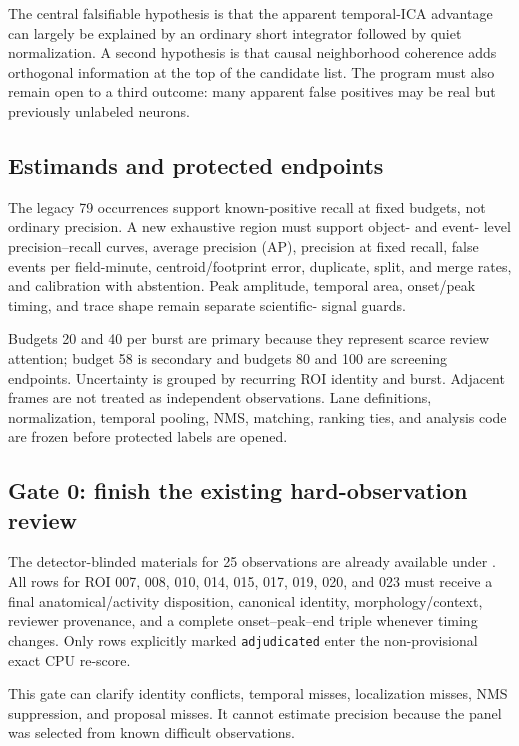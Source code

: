 The central falsifiable hypothesis is that the apparent temporal-ICA advantage
can largely be explained by an ordinary short integrator followed by quiet
normalization. A second hypothesis is that causal neighborhood coherence adds
orthogonal information at the top of the candidate list. The program must also
remain open to a third outcome: many apparent false positives may be real but
previously unlabeled neurons.

\subsection{Estimands and protected endpoints}

The legacy 79 occurrences support known-positive recall at fixed budgets, not
ordinary precision. A new exhaustive region must support object- and event-
level precision--recall curves, average precision (AP), precision at fixed
recall, false events per field-minute, centroid/footprint error, duplicate,
split, and merge rates, and calibration with abstention. Peak amplitude,
temporal area, onset/peak timing, and trace shape remain separate scientific-
signal guards.

Budgets 20 and 40 per burst are primary because they represent scarce review
attention; budget 58 is secondary and budgets 80 and 100 are screening
endpoints. Uncertainty is grouped by recurring ROI identity and burst. Adjacent
frames are not treated as independent observations. Lane definitions,
normalization, temporal pooling, NMS, matching, ranking ties, and analysis code
are frozen before protected labels are opened.

\subsection{Gate 0: finish the existing hard-observation review}

The detector-blinded materials for 25 observations are already available under
. All rows for ROI 007, 008, 010, 014, 015,
017, 019, 020, and 023 must receive a final anatomical/activity disposition,
canonical identity, morphology/context, reviewer provenance, and a complete
onset--peak--end triple whenever timing changes. Only rows explicitly marked
\texttt{adjudicated} enter the non-provisional exact CPU re-score.

This gate can clarify identity conflicts, temporal misses, localization misses,
NMS suppression, and proposal misses. It cannot estimate precision because the
panel was selected from known difficult observations.

